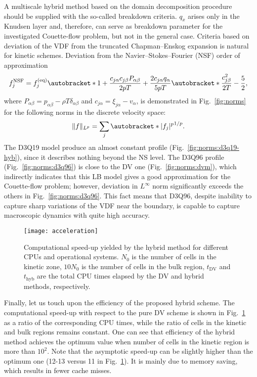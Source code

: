 \documentclass[]{elsarticle} %
\DeclarePairedDelimiter\autobracket()       %
\newcommand{\br}[1]{\autobracket*{#1}}
\newcommand{\xiai}{\xi_{j \alpha}}
\newcommand{\cai}{c_{j \alpha}}
\newcommand{\caj}{c_{j \beta}}
\newcommand{\equil}[1]{#1^\mathrm{(eq)}}
\begin{document}
{%
A multiscale hybrid method based on the domain decomposition procedure should be supplied with the so-called breakdown criteria.
\(q_x\) arises only in the Knudsen layer and, therefore, can serve as breakdown parameter
for the investigated Couette-flow problem, but not in the general case.
Criteria based on deviation of the VDF from the truncated Chapman--Enskog expansion is natural for kinetic schemes.
Deviation from the Navier--Stokes--Fourier (NSF) order of approximation~\cite{Zhang2014}
\begin{equation}\label{eq:NSF}
    f^{\mathrm{NSF}}_j = \equil{f}_j\br{
        1 + \frac{\cai\caj P_{\alpha\beta}}{2pT} + \frac{2\cai q_\alpha}{5pT}\br{\frac{\caj^2}{2T} - \frac52} },
\end{equation}
where \(P_{\alpha\beta} = p_{\alpha\beta} - \rho T\delta_{\alpha\beta}\) and \(\cai = \xiai - v_\alpha\),
is demonstrated in Fig.~\ref{fig:norms} for the following norms in the discrete velocity space:
\begin{equation}\label{eq:norms}
    \|f\|_{L^p} = \sum_j \br{|f_j|^p}^{1/p}.
\end{equation}
The D3Q19 model produce an almost constant profile (Fig.~\ref{fig:norms:d3q19-hyb}), since it describes nothing beyond the NS level.
The D3Q96 profile (Fig.~\ref{fig:norms:d3q96}) is close to the DV one (Fig.~\ref{fig:norms:dvm}),
which indirectly indicates that this LB model gives a good approximation for the Couette-flow problem;
however, deviation in \(L^\infty\) norm significantly exceeds the others in Fig.~\ref{fig:norms:d3q96}.
This fact means that D3Q96, despite inability to capture sharp variations of the VDF near the boundary,
is capable to capture macroscopic dynamics with quite high accuracy.

\begin{figure}
    \centering
    \texttt{[image: acceleration]}
    \caption{
        Computational speed-up yielded by the hybrid method for different CPUs and operational systems.
        $N_0$ is the number of cells in the kinetic zone, $10N_0$ is the number of cells in the bulk region,
        $t_\mathrm{DV}$ and $t_\mathrm{hyb}$ are the total CPU times elapsed by the DV and hybrid methods, respectively.
    }\label{fig:speed-up}
\end{figure}

Finally, let us touch upon the efficiency of the proposed hybrid scheme.
The computational speed-up with respect to the pure DV scheme is shown in Fig.~\ref{fig:speed-up} as a ratio of the corresponding CPU times,
while the ratio of cells in the kinetic and bulk regions remains constant.
One can see that efficiency of the hybrid method achieves the optimum value when number of cells in the kinetic region is more than $10^2$.
Note that the asymptotic speed-up can be slightly higher than the optimum one (12-13 versus 11 in Fig.~\ref{fig:speed-up}).
It is mainly due to memory saving, which results in fewer cache misses.

}
\end{document}
